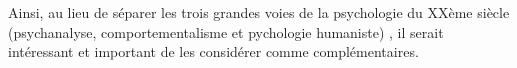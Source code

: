 

                            Ainsi, au lieu de séparer les trois grandes voies de la psychologie du
                            XXème siècle (psychanalyse, comportementalisme et pychologie
                            humaniste)
                            \autocite[197]{van_eersel_cerveau}, il serait intéressant et important de les
                            considérer comme complémentaires.




































